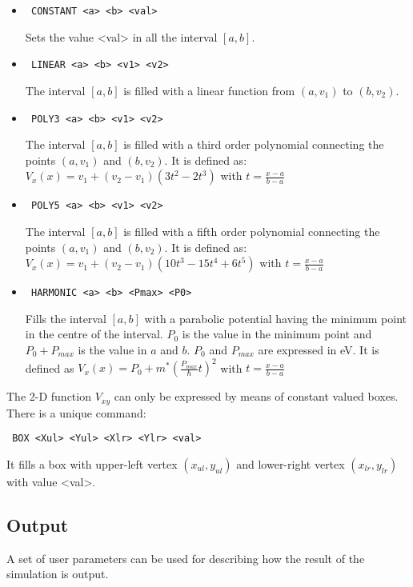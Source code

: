 \documentclass[a4paper,11pt]{article}
\begin{document}
\begin{itemize}
\begin{itemize}
  \item \begin{verbatim} CONSTANT <a> <b> <val> \end{verbatim}
    Sets the value <val> in all the interval $[a, b]$.
  \item \begin{verbatim} LINEAR <a> <b> <v1> <v2> \end{verbatim}
    The interval $[a, b]$ is filled with a linear function from $(a, v_1)$ to $(b, v_2)$.
  \item \begin{verbatim} POLY3 <a> <b> <v1> <v2> \end{verbatim}
    The interval $[a, b]$ is filled with a third order polynomial connecting
    the points $(a, v_1)$ and $(b, v_2)$. It is defined as:
    $ V_x(x) = v_1 + (v_2-v_1)( 3t^2 - 2t^3 ) $ with $t = \frac{x-a}{b-a} $
  \item \begin{verbatim} POLY5 <a> <b> <v1> <v2> \end{verbatim}
    The interval $[a, b]$ is filled with a fifth order polynomial connecting
    the points $(a, v_1)$ and $(b, v_2)$. It is defined as:
    $ V_x(x) = v_1 + (v_2-v_1)( 10t^3 - 15t^4 + 6t^5) $ with $t = \frac{x-a}{b-a} $
  \item \begin{verbatim} HARMONIC <a> <b> <Pmax> <P0> \end{verbatim}
    Fills the interval $[a, b]$ with a parabolic potential having the minimum point in the centre of the interval. $P_0$ is the value in the minimum point and $P_0 + P_{max}$ is the value in $a$ and $b$.
    $P_0$ and $P_{max}$ are expressed in eV. It is defined as
    $ V_x(x) = P_0 + m^* \left(\frac{P_{max}}{\hbar} t \right)^2 $ with $t = \frac{x-a}{b-a} $
\end{itemize}

The 2-D function $V_{xy}$ can only be expressed by means of constant valued boxes. There is a unique command:
\begin{verbatim} BOX <Xul> <Yul> <Xlr> <Ylr> <val> \end{verbatim}
  It fills a box with upper-left vertex $(x_{ul}, y_{ul})$ and lower-right vertex $(x_{lr}, y_{lr})$
  with value <val>.
\end{itemize}

\subsection{Output}
A set of user parameters can be used for describing how the result of the simulation is output.
\end{document}
